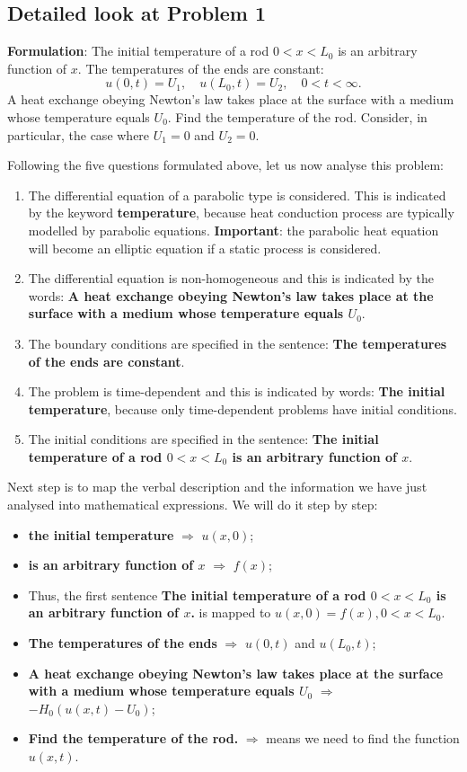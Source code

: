 \subsection{Detailed look at Problem 1}

{\bfseries Formulation}: The initial temperature of a rod $0<x<L_{0}$ is an arbitrary function of $x$. The temperatures of the ends are constant:
\begin{equation*}
u(0,t) = U_{1}, \quad u(L_{0},t) = U_{2}, \quad 0<t<\infty.
\end{equation*}
A heat exchange obeying Newton's law takes place at the surface with a medium whose temperature equals $U_{0}$. Find the temperature of the rod. Consider, in particular, the case where $U_{1}=0$ and $U_{2}=0$.\par
Following the five questions formulated above, let us now analyse this problem:
\begin{enumerate}
\item The differential equation of a parabolic type is considered. This is indicated by the keyword {\bfseries temperature}, because heat conduction process are typically modelled by parabolic equations. {\bfseries Important}: the parabolic heat equation will become an elliptic equation if a static process is considered.
\item The differential equation is non-homogeneous and this is indicated by the words: {\bfseries A heat exchange obeying Newton's law takes place at the surface with a medium whose temperature equals $U_{0}$}.
\item The boundary conditions are specified in the sentence: {\bfseries The temperatures of the ends are constant}.
\item The problem is time-dependent and this is indicated by words: {\bfseries The initial temperature}, because only time-dependent problems have initial conditions.
\item The initial conditions are specified in the sentence: {\bfseries The initial temperature of a rod $0<x<L_{0}$ is an arbitrary function of $x$}.
\end{enumerate}
Next step is to map the verbal description and the information we have just analysed into mathematical expressions. We will do it step by step:
\begin{itemize}
\item {\bfseries the initial temperature} $\Longrightarrow$ $u(x,0)$;
\item {\bfseries is an arbitrary function of $x$} $\Longrightarrow$ $f(x)$;
\item Thus, the first sentence {\bfseries The initial temperature of a rod $0<x<L_{0}$ is an arbitrary function of $x$.} is mapped to $u(x,0)=f(x), 0<x<L_{0}$.
\item {\bfseries The temperatures of the ends} $\Longrightarrow$ $u(0,t)$ and $u(L_{0},t)$;
\item {\bfseries A heat exchange obeying Newton's law takes place at the surface with a medium whose temperature equals $U_{0}$} $\Longrightarrow$ $-H_{0}(u(x,t)-U_{0})$;
\item {\bfseries Find the temperature of the rod.} $\Longrightarrow$ means we need to find the function $u(x,t)$.
\end{itemize}
